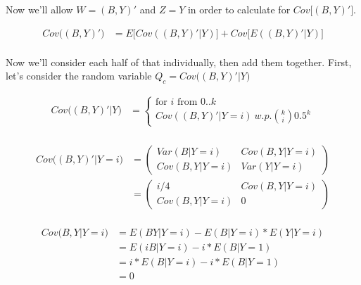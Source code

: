 \documentclass[12pt]{article}
\begin{document}
Now we'll allow $W=(B,Y)'$ and $Z=Y$ in order to calculate for $Cov\big[(B,Y)'\big]$.

\begin{equation*}
	\begin{aligned}
	Cov\big((B,Y)'\big) &= E\big[Cov((B,Y)'|Y)\big] + Cov\big[E((B,Y)'|Y)\big]\\
	\end{aligned}
\end{equation*}

Now we'll consider each half of that individually, then add them together. First, let's consider the random variable $Q_c = Cov\big((B,Y)'|Y\big)$

\begin{equation*}
	\begin{aligned}
		Cov\big((B,Y)' | Y\big) &=
		\begin{cases}
			\textrm{for $i$ from $0..k$} \\
			Cov((B,Y)'|Y=i)\: w.p.\binom{k}{i} 0.5^k
		\end{cases}
		\\
	\end{aligned}
\end{equation*}

\begin{equation*}
	\begin{aligned}
		Cov\big((B,Y)' | Y=i\big) &=
		 \left(
		\begin{array}{cc}
			Var(B|Y=i) & Cov(B,Y|Y=i)\\
			Cov(B,Y | Y=i) & Var(Y|Y=i)
		\end{array}
		\right) \\
		&=
		 \left(
		\begin{array}{cc}
			i/4 & Cov(B,Y|Y=i)\\
			Cov(B,Y | Y=i) & 0
		\end{array}
		\right) \\
	\end{aligned}
\end{equation*}


\begin{equation*}
	\begin{aligned}
		Cov\big(B,Y | Y=i\big) &=
		E(BY|Y=i) - E(B|Y=i) * E(Y|Y=i)\\
		& = E(iB|Y=i) - i * E(B|Y=1)\\
		& = i*E(B|Y=i) - i * E(B|Y=1)\\
		& = 0
	\end{aligned}
\end{equation*}
\end{document}
